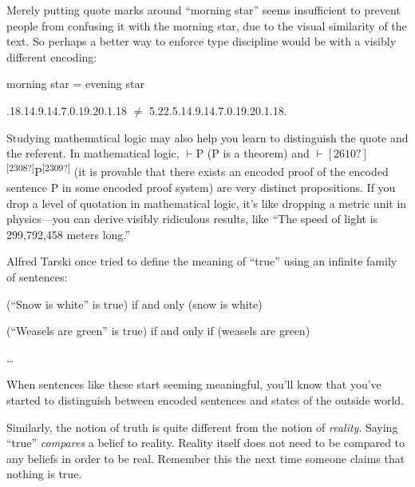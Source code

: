 {
 Merely putting quote marks around ``morning
star'' seems insufficient to prevent people from
confusing it with the morning star, due to the visual similarity of the
text. So perhaps a better way to enforce type discipline would be with
a visibly different encoding:}

{\centering
 morning star = evening star
\par}


\bigskip

{.18.14.9.14.7.0.19.20.1.18 ${\neq}$
5.22.5.14.9.14.7.0.19.20.1.18.
\par}


\bigskip

{
 Studying mathematical logic may also help you learn to distinguish
the quote and the referent. In mathematical logic, ${\vdash}$P (P is a
theorem) and
${\vdash}[2610?]$\textsuperscript{[2308?]}P\textsuperscript{[2309?]}
(it is provable that there exists an encoded proof of the encoded
sentence P in some encoded proof system) are very distinct
propositions. If you drop a level of quotation in mathematical logic,
it's like dropping a metric unit in physics---you can
derive visibly ridiculous results, like ``The speed of
light is 299,792,458 meters long.''}

{
 Alfred Tarski once tried to define the meaning of
``true'' using an infinite family of
sentences:}

{\centering
 (``Snow is white'' is true) if
and only (snow is white)
\par}


\bigskip

{\centering
 (``Weasels are green'' is true)
if and only if (weasels are green)
\par}


\bigskip

{\centering
 \ldots
\par}


\bigskip

{
 When sentences like these start seeming meaningful,
you'll know that you've started to
distinguish between encoded sentences and states of the outside world.}

{
 Similarly, the notion of truth is quite different from the notion
of \textit{reality}. Saying ``true''
\textit{compares} a belief to reality. Reality itself does not need to
be compared to any beliefs in order to be real. Remember this the next
time someone claims that nothing is true.}

\myendsectiontext


